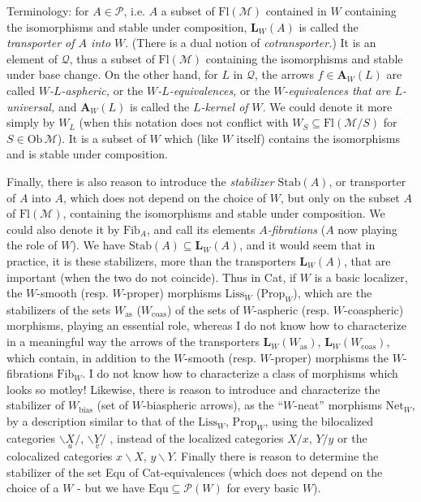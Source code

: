 \documentclass[11pt]{article}
\newcommand{\printedpage}[1]{\marginpar{\footnotesize p.~#1}}
\newcommand{\msp}[1]{\marginpar{\footnotesize [#1]}}
\newcommand{\Fl}{\mathrm{Fl}}
\newcommand{\Fib}{\mathrm{Fib}}
\begin{document}
Terminology: for $A \in \mathcal{P}$, i.e. $A$ a subset of $\Fl(\mathcal{M})$ contained in $W$ containing the isomorphisms and stable under composition, $\mathbf{L}_W(A)$ is called the \textit{transporter of $A$ into $W$}. (There is a dual notion of \textit{cotransporter.}) It is an element of $\mathcal{Q}$, thus a subset of $\Fl(\mathcal{M})$ containing the isomorphisms and stable under base change. On the other hand, for $L$ in $\mathcal{Q}$, the arrows $f \in \mathbf{A}_W(L)$ are called \textit{$W$-$L$-aspheric,} or the \textit{$W$-$L$-equivalences,} or the \textit{$W$-equivalences that are $L$-universal,} and $\mathbf{A}_W(L)$ is called the \textit{$L$-kernel of $W$}. We could denote it more simply by $W_L$ (when this notation does not conflict with $W_S \subseteq \Fl(\mathcal{M}/S)$ for $S \in \mathrm{Ob}\,\mathcal{M}$). It is a subset of $W$ which (like $W$ itself) contains the isomorphisms and is stable under composition. %

Finally, there is also reason to introduce the \textit{stabilizer} $\mathrm{Stab}(A)$, or transporter of $A$ into $A$, which does not depend on the choice of $W$, but only on the subset $A$ of $\Fl(\mathcal{M})$, containing the isomorphisms and stable under composition. We could also denote it by $\Fib_A$, and call its elements \textit{$A$-fibrations} ($A$ now playing the role of $W$). We have $\mathrm{Stab}(A) \subseteq \mathbf{L}_W(A)$, and it would seem that in %
\printedpage{55}
\msp{page 89}
practice, it is these stabilizers, more than the transporters $\mathbf{L}_W(A)$, that are important (when the two do not coincide). Thus in Cat, if $W$ is a basic localizer, the $W$-smooth (resp. $W$-proper) morphisms $\mathrm{Liss}_W$ ($\mathrm{Prop}_W$), which are the stabilizers of the sets $W_{\mathrm{as}}$ ($W_{\mathrm{coas}}$) of the sets of $W$-aspheric (resp. $W$-coaspheric) morphisms, playing an essential role, whereas I do not know how to characterize in a meaningful way the arrows of the transporters $\mathbf{L}_W(W_{\mathrm{as}})$, $\mathbf{L}_W(W_{\mathrm{coas}})$, which contain, in addition to the $W$-smooth (resp. $W$-proper) morphisms the $W$-fibrations $\Fib_W$. I do not know how to characterize a class of morphisms which looks so motley! Likewise, there is reason to introduce and characterize the stabilizer of $W_{\mathrm{bias}}$ (set of $W$-biaspheric arrows), as the ``$W$-neat'' morphisms $\mathrm{Net}_W$, by a description similar to that of the $\mathrm{Liss}_W$, $\mathrm{Prop}_W$, using the bilocalized categories $\backslash\underset{u}{X}/$, $\backslash\underset{v}{Y}/$ , instead of the localized categories $X/x$, $Y/y$ or the colocalized categories $x\backslash X$, $y\backslash Y$. Finally there is reason to determine the stabilizer of the set Equ of Cat-equivalences (which does not depend on the choice of a $W$ - but we have $\mathrm{Equ} \subseteq \mathcal{P}(W)$ for every basic $W$). %
\end{document}
